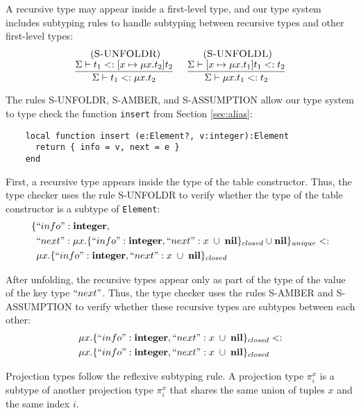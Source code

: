 A recursive type may appear inside a first-level type, and our
type system includes subtyping rules to handle subtyping between
recursive types and other first-level types:
\[
\begin{array}{c}
\begin{array}{c}
\; (\textsc{S-UNFOLDR})\\
\dfrac{\Sigma \vdash t_{1} <: [x \mapsto \mu x.t_{2}]t_{2}}
      {\Sigma \vdash t_{1} <: \mu x.t_{2}}
\end{array}
\;
\begin{array}{c}
\; (\textsc{S-UNFOLDL})\\
\dfrac{\Sigma \vdash [x \mapsto \mu x.t_{1}]t_{1} <: t_{2}}
      {\Sigma \vdash \mu x.t_{1} <: t_{2}}
\end{array}
\end{array}
\]

The rules \textsc{S-UNFOLDR}, \textsc{S-AMBER}, and \textsc{S-ASSUMPTION}
allow our type system to type check the function \texttt{insert}
from Section \ref{sec:alias}:
\begin{verbatim}
    local function insert (e:Element?, v:integer):Element
      return { info = v, next = e }
    end
\end{verbatim}

First, a recursive type appears inside the type of the table constructor.
Thus, the type checker uses the rule \textsc{S-UNFOLDR} to verify whether
the type of the table constructor is a subtype of \texttt{Element}:
\begin{align*}
\{ & ``info":\mathbf{integer}, \\
   & ``next":\mu x.\{``info":\mathbf{integer}, ``next":x \;\cup\; \mathbf{nil}\}_{closed} \cup \mathbf{nil} \}_{unique} <: \\
& \mu x.\{``info":\mathbf{integer}, ``next":x \;\cup\; \mathbf{nil}\}_{closed}
\end{align*}

After unfolding, the recursive types appear only as part of the type
of the value of the key type $``next"$.
Thus, the type checker uses the rules \textsc{S-AMBER} and \textsc{S-ASSUMPTION}
to verify whether these recursive types are subtypes between each other:
\begin{align*}
& \mu x.\{``info":\mathbf{integer}, ``next":x \;\cup\; \mathbf{nil}\}_{closed} <: \\
& \mu x.\{``info":\mathbf{integer}, ``next":x \;\cup\; \mathbf{nil}\}_{closed}
\end{align*}

Projection types follow the reflexive subtyping rule.
A projection type $\pi_{i}^{x}$ is a subtype of another projection type $\pi_{i}^{x}$
that shares the same union of tuples $x$ and the same index $i$.

